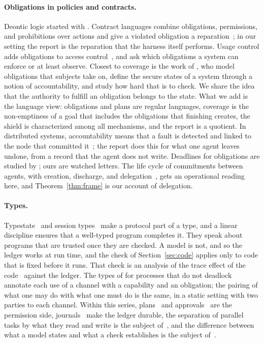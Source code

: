 \documentclass[acmsmall,nonacm,screen]{acmart}
\begin{document}
\paragraph{Obligations in policies and contracts.} Deontic logic started with
\citet{vonwright1951}. Contract languages combine obligations, permissions, and prohibitions
over actions and give a violated obligation a reparation~\cite{prisacariu2007}; in our
setting the report is the reparation that the harness itself performs. Usage control adds
obligations to access control~\cite{park2004}, and \citet{hilty2005} ask which obligations a
system can enforce or at least observe. Closest to coverage is the work of
\citet{irwin2006}, who model obligations that subjects take on, define the secure states of
a system through a notion of accountability, and study how hard that is to check. We share
the idea that the authority to fulfill an obligation belongs to the state. What we add is
the language view: obligations and plans are regular languages, coverage is the
non-emptiness of a goal that includes the obligations that finishing creates, the shield is
characterized among all mechanisms, and the report is a quotient. In distributed systems, accountability means that a fault is
detected and linked to the node that committed it~\cite{haeberlen2007}; the report does this
for what one agent leaves undone, from a record that the agent does not write. Deadlines for obligations
are studied by \citet{dignum2004}; ours are watched letters. The life cycle of commitments
between agents, with creation, discharge, and delegation~\cite{singh1999}, gets an
operational reading here, and Theorem~\ref{thm:frame} is our account of delegation.

\paragraph{Types.} Typestate~\cite{strom1986,deline2001} and session
types~\cite{honda1998} make a protocol part of a type, and a linear discipline ensures that
a well-typed program completes it. They speak about programs that are trusted once they are
checked. A model is not, and so the ledger works at run time, and the check of
Section~\ref{sec:code} applies only to code that is fixed before it runs. That check is an
analysis of the trace effect of the code~\cite{skalka2008} against the ledger. The types of
\citet{kobayashi2006} for processes that do not deadlock annotate each use of a channel
with a capability and an obligation; the pairing of what one may do with what one must do is
the same, in a static setting with two parties to each channel. Within this series,
plans~\cite{tpp11} and approvals~\cite{tpp4} are the permission side, journals~\cite{tpp8}
make the ledger durable, the separation of parallel tasks by what they read and write is
the subject of~\cite{tpp9}, and the difference between what a model states and what a check
establishes is the subject of~\cite{tpp10}.
\end{document}
